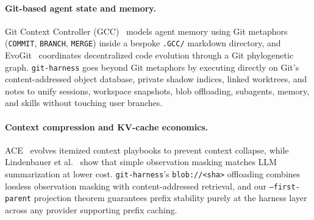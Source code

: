 \documentclass[11pt]{article}
\begin{document}
\begin{table}[!t]
\centering
\caption{Architectural comparison of \texttt{git-harness} against contemporary coding agent harnesses.}
\label{tab:compare}
\end{table}

\paragraph{Git-based agent state and memory.}
Git Context Controller (GCC)~\citep{wu2025gcc} models agent memory using Git metaphors (\texttt{COMMIT}, \texttt{BRANCH}, \texttt{MERGE}) inside a bespoke \texttt{.GCC/} markdown directory, and EvoGit~\citep{evogit2025} coordinates decentralized code evolution through a Git phylogenetic graph.
\texttt{git-harness} goes beyond Git metaphors by executing directly on Git's content-addressed object database, private shadow indices, linked worktrees, and notes to unify sessions, workspace snapshots, blob offloading, subagents, memory, and skills without touching user branches.

\paragraph{Context compression and KV-cache economics.}
ACE~\citep{zhang2026ace} evolves itemized context playbooks to prevent context collapse, while Lindenbauer et al.~\citep{lindenbauer2025complexity} show that simple observation masking matches LLM summarization at lower cost.
\texttt{git-harness}'s \texttt{blob://<sha>} offloading combines lossless observation masking with content-addressed retrieval, and our \texttt{--first-parent} projection theorem guarantees prefix stability purely at the harness layer across any provider supporting prefix caching.
\end{document}
